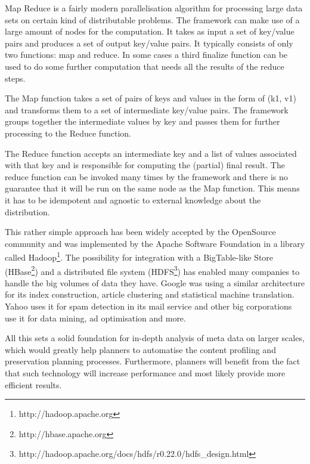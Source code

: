 Map Reduce is a fairly modern parallelisation algorithm for processing large data sets on certain kind of distributable problems. The framework can make use of a large amount of nodes for the computation. It takes as input a set of key/value pairs and produces a set of output key/value pairs. It typically consists of only two functions: map and reduce. In some cases a third finalize function can be used to do some further computation that needs all the results of the reduce steps.

The Map function takes a set of pairs of keys and values in the form of (k1, v1) and transforms them to a set of intermediate key/value pairs. The framework groups together the intermediate values by key and passes them for further processing to the Reduce function.

The Reduce function accepts an intermediate key and a list of values associated with that key and is responsible for computing the (partial) final result. The reduce function can be invoked many times by the framework and there is no guarantee that it will be run on the same node as the Map function. This means it has to be idempotent and agnostic to external knowledge about the distribution.

This rather simple approach has been widely accepted by the OpenSource community and was implemented by the Apache Software Foundation in a library called Hadoop\footnote{http://hadoop.apache.org}. The possibility for integration with a BigTable-like Store \cite{Chang:2008:BDS:1365815.1365816} (HBase\footnote{http://hbase.apache.org}) and a distributed file system (HDFS\footnote{http://hadoop.apache.org/docs/hdfs/r0.22.0/hdfs\_design.html}) has enabled many companies to handle the big volumes of data they have. Google was using a similar architecture for its index construction, article clustering and statistical machine translation. Yahoo uses it for spam detection in its mail service and other big corporations use it for data mining, ad optimisation and more.

All this sets a solid foundation for in-depth analysis of meta data on larger scales, which would greatly help planners to automatise the content profiling and preservation planning processes. Furthermore, planners will benefit from the fact that such technology will increase performance and most likely provide more efficient results.

